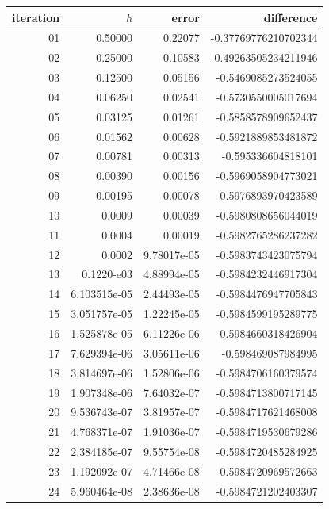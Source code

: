 \documentclass[10pt,fleqn]{article}
\begin{document}
\begin{tabular}{r|r|r|r|}
iteration &  \(h\) & error & difference \\ 
\hline
  01 &  0.50000      & 0.22077     &  -0.37769776210702344 \\
  02 &  0.25000      & 0.10583     &  -0.49263505234211946 \\
  03 &  0.12500      & 0.05156     &  -0.5469085273524055  \\
  04 &  0.06250      & 0.02541     &  -0.5730550005017694  \\
  05 &  0.03125      & 0.01261     &  -0.5858578909652437  \\
  06 &  0.01562      & 0.00628     &  -0.5921889853481872  \\
  07 &  0.00781      & 0.00313     &  -0.595336604818101   \\
  08 &  0.00390      & 0.00156     &  -0.5969058904773021  \\
  09 &  0.00195      & 0.00078     &  -0.5976893970423589  \\
  10 &  0.0009       & 0.00039     &  -0.5980808656044019  \\
  11 &  0.0004       & 0.00019     &  -0.5982765286237282  \\
  12 &  0.0002       & 9.78017e-05 &  -0.5983743423075794  \\
  13 &  0.1220-e03   & 4.88994e-05 &  -0.5984232446917304  \\
  14 &  6.103515e-05 & 2.44493e-05 &  -0.5984476947705843  \\
  15 &  3.051757e-05 & 1.22245e-05 &  -0.5984599195289775  \\
  16 &  1.525878e-05 & 6.11226e-06 &  -0.5984660318426904  \\
  17 &  7.629394e-06 & 3.05611e-06 &  -0.598469087984995   \\
  18 &  3.814697e-06 & 1.52806e-06 &  -0.5984706160379574  \\
  19 &  1.907348e-06 & 7.64032e-07 &  -0.5984713800717145  \\
  20 &  9.536743e-07 & 3.81957e-07 &  -0.5984717621468008  \\
  21 &  4.768371e-07 & 1.91036e-07 &  -0.5984719530679286  \\
  22 &  2.384185e-07 & 9.55754e-08 &  -0.5984720485284925  \\
  23 &  1.192092e-07 & 4.71466e-08 &  -0.5984720969572663  \\
  24 &  5.960464e-08 & 2.38636e-08 &  -0.5984721202403307  \\

\end{tabular}
\end{document}
